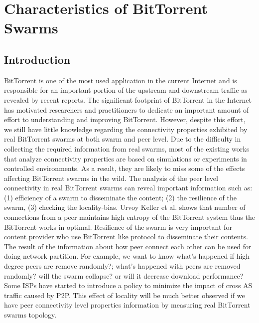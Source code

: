 \chapter{Characteristics of BitTorrent Swarms}
\section{Introduction}
BitTorrent is one of the most used application in the current Internet and is responsible for an important portion of the upstream and downstream traffic as revealed by recent reports. 
The significant footprint of BitTorrent in the Internet has motivated researchers and practitioners to dedicate an important amount of effort to understanding and improving BitTorrent. 
However, despite this effort, we still have little knowledge regarding the connectivity properties exhibited by real BitTorrent swarms at both swarm and peer level. 
Due to the difficulty in collecting the required information from real swarms, most of the existing works that analyze connectivity properties are based on simulations or experiments in controlled environments. 
As a result, they are likely to miss some of the effects affecting BitTorrent swarms in the wild. 
The analysis of the peer level connectivity in real BitTorrent swarms can reveal important information such as: (1) efficiency of a swarm to disseminate the content; (2) the resilience of the swarm, (3) checking the locality-bias.   
Urvoy Keller et al.\cite{urvoy2007impact} shows that number of connections from a peer maintains high entropy of the BitTorrent system thus the BitTorrent works in optimal.
Resilience of the swarm is very important for content provider who use BitTorrent like protocol to disseminate their contents. 
The result of the information about how peer connect each other can be used for doing network partition.  
For example, we want to know what's happened if high degree peers are remove randomly?; what's happened with peers are removed randomly? will the swarm collapse? or will it decrease download performance?
Some ISPs have started to introduce a policy to minimize the impact of cross AS traffic caused by P2P. 
This effect of locality will be much better observed if we have peer connectivity level properties information by measuring real BitTorrent swarms topology.

